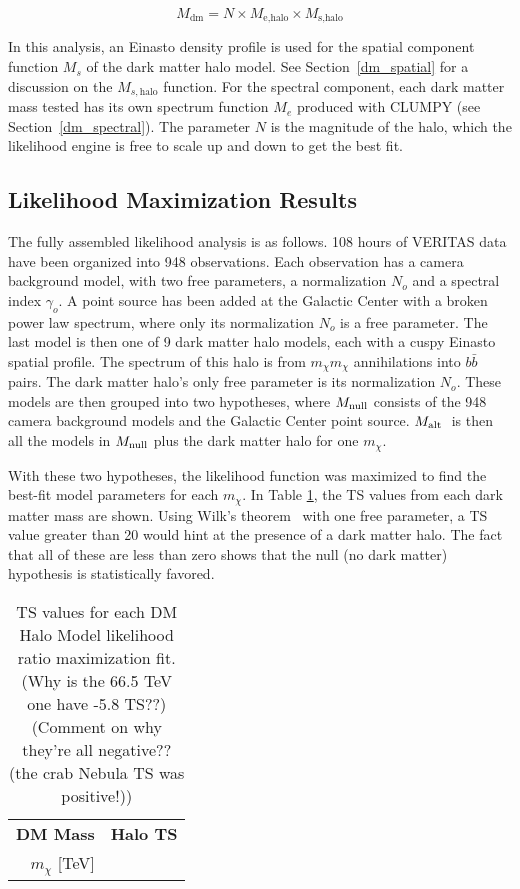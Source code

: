   \begin{equation}\label{eqn:dmmodel}
    M_{\textrm{dm}} = N \times M_{\textrm{e,halo}} \times M_{\textrm{s,halo}}
  \end{equation}
  
  In this analysis, an Einasto density profile is used for the spatial component function $M_s$ of the dark matter halo model.
  See Section~\ref{dm_spatial} for a discussion on the $M_{s,\textrm{halo}}$ function.
  For the spectral component, each dark matter mass tested has its own spectrum function $M_e$ produced with CLUMPY (see Section~\ref{dm_spectral}).
  The parameter $N$ is the magnitude of the halo, which the likelihood engine is free to scale up and down to get the best fit.

  \subsection{Likelihood Maximization Results}\label{like_results}

  The fully assembled likelihood analysis is as follows.
  108 hours of VERITAS data have been organized into 948 observations.
  Each observation has a camera background model, with two free parameters, a normalization $N_o$ and a spectral index $\gamma_o$.
  A point source has been added at the Galactic Center with a broken power law spectrum, where only its normalization $N_o$ is a free parameter.
  The last model is then one of 9 dark matter halo models, each with a cuspy Einasto spatial profile.
  The spectrum of this halo is from $m_{\chi}m_{\chi}$ annihilations into $b\bar{b}$ pairs.
  The dark matter halo's only free parameter is its normalization $N_o$.
  These models are then grouped into two hypotheses, where $M_\textrm{null}$ consists of the 948 camera background models and the Galactic Center point source.
  $M_\textrm{alt }$ is then all the models in $M_\textrm{null}$ plus the dark matter halo for one $m_{\chi}$.
  
  With these two hypotheses, the likelihood function was maximized to find the best-fit model parameters for each $m_{\chi}$.
  In Table \ref{tab:tsvals}, the TS values from each dark matter mass are shown.
  Using Wilk's theorem~\cite{wilks1938} with one free parameter, a TS value greater than 20 would hint at the presence of a dark matter halo.
  The fact that all of these are less than zero shows that the null (no dark matter) hypothesis is statistically favored.

  \begin{table}[!t]
    \centering
    \begin{tabular}{|r|r|}
      \hline
      \textbf{DM Mass}        & \textbf{Halo TS} \\
      \textbf{$m_\chi$} [TeV] &                  \\
      \hline 
      
      \hline 
    \end{tabular}
    \caption[DM Halo TS Values]{
      TS values for each DM Halo Model likelihood ratio maximization fit.
      {\color{red}(Why is the 66.5 TeV one have -5.8 TS??)}
      {\color{red}(Comment on why they're all negative?? (the crab Nebula TS was positive!))}
    }
    \label{tab:tsvals}
  \end{table}

